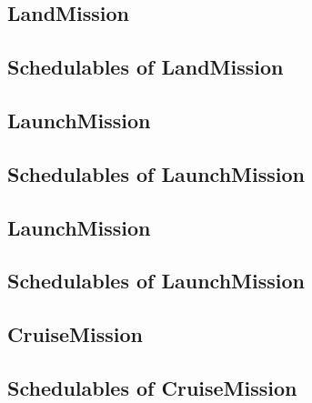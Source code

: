 \documentclass[10pt,a4paper]{article}
\begin{document}

\newpage


\newpage


\subsection{LandMission}

\newpage

\subsection{Schedulables of LandMission}


\newpage


\newpage


\newpage


\subsection{LaunchMission}

\newpage

\subsection{Schedulables of LaunchMission}


\newpage


\subsection{LaunchMission}

\newpage

\subsection{Schedulables of LaunchMission}


\newpage


\subsection{CruiseMission}

\newpage

\subsection{Schedulables of CruiseMission}
\end{document}
